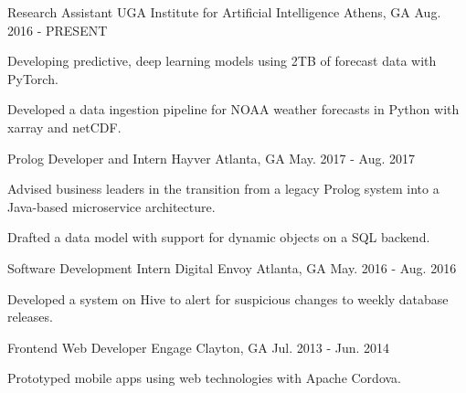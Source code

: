\begin{cventries}

\cventry
{Research Assistant}
{UGA Institute for Artificial Intelligence}
{Athens, GA}
{Aug. 2016 - PRESENT}
{\begin{cvitems}
    \item {Developing predictive, deep learning models using 2TB of forecast data with PyTorch.}
    \item {Developed a data ingestion pipeline for NOAA weather forecasts in Python with xarray and netCDF.}
\end{cvitems}}

\cventry
{Prolog Developer and Intern}
{Hayver}
{Atlanta, GA}
{May. 2017 - Aug. 2017}
{\begin{cvitems}
    \item {Advised business leaders in the transition from a legacy Prolog system into a Java-based microservice architecture.}
    \item {Drafted a data model with support for dynamic objects on a SQL backend.}
\end{cvitems}}

\cventry
{Software Development Intern}
{Digital Envoy}
{Atlanta, GA}
{May. 2016 - Aug. 2016}
{\begin{cvitems}
    \item {Developed a system on Hive to alert for suspicious changes to weekly database releases.}
\end{cvitems}}

\cventry
{Frontend Web Developer}
{Engage}
{Clayton, GA}
{Jul. 2013 - Jun. 2014}
{{\begin{cvitems}
    \item {Prototyped mobile apps using web technologies with Apache Cordova.}
\end{cvitems}}}

\end{cventries}
